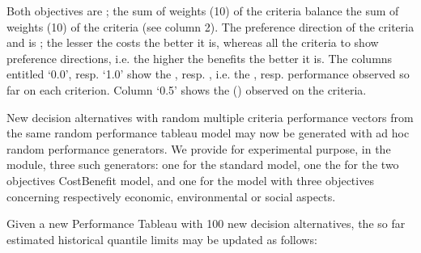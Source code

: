 \documentclass[a4paper,12pt,english]{sphinxhowto}
\begin{document}
Both objectives are ; the sum of weights (10) of the  criteria balance the sum of weights (10) of the  criteria (see column 2). The preference direction of the  criteria  and  is ; the lesser the costs the better it is, whereas all the  criteria  to  show  preference directions, i.e. the higher the benefits the better it is. The columns entitled ‘0.0’, resp. ‘1.0’ show the  , resp. , i.e. the , resp.  performance observed so far on each criterion. Column ‘0.5’ shows the  () observed on the criteria.

New  decision alternatives with random multiple criteria performance vectors from the same random performance tableau model may now be generated with ad hoc random performance generators. We provide for experimental purpose, in the  module, three such generators: one for the standard  model, one the for the two objectives  Cost\sphinxhyphen{}Benefit model, and one for the  model with three objectives concerning respectively  economic, environmental or social aspects.

Given a new Performance Tableau with 100 new decision alternatives, the so far estimated historical quantile limits may be updated as follows:

\begin{sphinxVerbatim}[commandchars=\\\{\},numbers=left,firstnumber=1,stepnumber=1]
   
  
  
\end{sphinxVerbatim}
\end{document}
